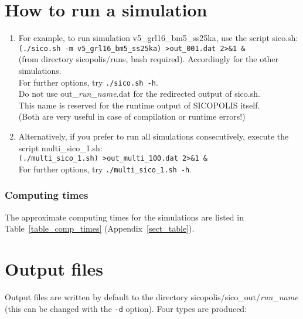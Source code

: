 \documentclass[12pt,a4paper]{article}
\begin{document}

\section{How to run a simulation}

\begin{enumerate}

\item For example, to run simulation v5\_grl16\_bm5\_ss25ka, use the script sico.sh:
\\
\hspace*{10mm}\verb+(./sico.sh -m v5_grl16_bm5_ss25ka) >out_001.dat 2>&1 &+
\\
(from directory sicopolis/runs, bash required). Accordingly for the other simulations.
\\
For further options, try \verb+./sico.sh -h+.
\\
\warning{} Do not use out\_\emph{run\_name}.dat for the redirected output of sico.sh. 
\\
\phantom{\warning{}} This name is reserved for the runtime output of SICOPOLIS itself.
\\
 (Both are very useful in case of compilation or runtime errors!)

\item Alternatively, if you prefer to run all simulations consecutively, execute the script multi\_sico\_1.sh:
\\
\hspace*{10mm}\verb+(./multi_sico_1.sh) >out_multi_100.dat 2>&1 &+
\\
For further options, try \verb+./multi_sico_1.sh -h+.

\end{enumerate}

\subsubsection*{Computing times}

The approximate computing times for the simulations are listed in Table~\ref{table_comp_times} (Appendix~\ref{sect_table}).

\section{Output files}
\label{sect_output}

Output files are written by default to the directory sicopolis/sico\_out/\emph{run\_name} (this can be changed with the \verb+-d+ option). Four types are produced:
\end{document}
